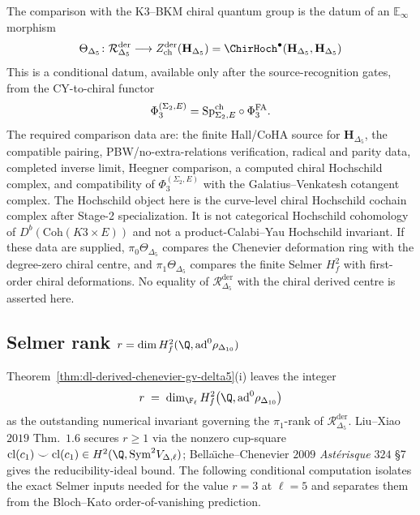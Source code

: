 \begin{remark}
\label{rem:dl-derived-chiral-bridge}
The comparison with the K3--BKM chiral quantum group is the
datum of an $\mathbb E_\infty$ morphism
\[
 \Theta_{\Delta_5}\colon
 \mathcal R^{\mathrm{der}}_{\Delta_5}
 \longrightarrow
 Z^{\mathrm{der}}_{\mathrm{ch}}(\mathbf H_{\Delta_5})
 =
 \ChirHoch^\bullet(\mathbf H_{\Delta_5},\mathbf H_{\Delta_5})
\]
This is a conditional datum, available only after the source-recognition
gates, from the CY-to-chiral functor
\[
 \Phi_3^{(\Sigma_2,E)}=\mathrm{Sp}^{\mathrm{ch}}_{\Sigma_2,E}\circ\Phi^{\mathrm{FA}}_3.
\]
The required comparison data are: the finite Hall/CoHA source for
$\mathbf H_{\Delta_5}$, the compatible pairing, PBW/no-extra-relations
verification, radical and parity data, completed inverse limit, Heegner
comparison, a computed chiral Hochschild complex, and
compatibility of $\Phi_3^{(\Sigma_2,E)}$ with the Galatius--Venkatesh cotangent
complex. The Hochschild object here is the curve-level chiral
Hochschild cochain complex after Stage-2 specialization. It is not
categorical Hochschild cohomology of $D^b(\mathrm{Coh}(K3\times E))$
and not a product-Calabi--Yau Hochschild invariant. If these data are
supplied, $\pi_0\Theta_{\Delta_5}$ compares the Chenevier deformation
ring with the degree-zero chiral centre, and
$\pi_1\Theta_{\Delta_5}$ compares the finite Selmer $H^2_f$ with
first-order chiral deformations. No equality of
$\mathcal R^{\mathrm{der}}_{\Delta_5}$ with the chiral derived centre
is asserted here.
\end{remark}

\subsection{Selmer rank $r=\dim H^2_f(\Q,\mathrm{ad}^0\rho_{\Delta_{10}})$}
\label{subsec:dl-selmer-rank-delta5}

Theorem~\ref{thm:dl-derived-chenevier-gv-delta5}(i) leaves the integer
\[
 r \;=\; \dim_{\F_\ell} H^2_f\bigl(\Q,\mathrm{ad}^0\rho_{\Delta_{10}}\bigr)
\]
as the outstanding numerical invariant governing the $\pi_1$-rank of
$\mathcal R^{\mathrm{der}}_{\Delta_5}$. Liu--Xiao $2019$ Thm.~$1.6$
secures $r\ge 1$ via the nonzero cup-square
$\mathrm{cl}(c_1)\smile\mathrm{cl}(c_1)\in H^2(\Q,\mathrm{Sym}^2 V_{\Delta,\ell})$;
Bella\"\i che--Chenevier $2009$ \emph{Ast\'erisque} $324$ \S 7 gives
the reducibility-ideal bound. The following conditional computation
isolates the exact Selmer inputs needed for the value $r=3$ at
$\ell=5$ and separates them from the Bloch--Kato
order-of-vanishing prediction.

